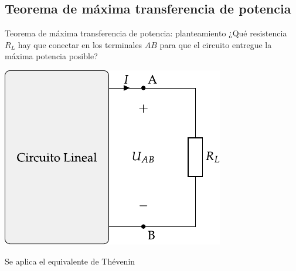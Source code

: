 \documentclass[aspectratio=169, xcolor={usenames,svgnames,dvipsnames}]{beamer}
\begin{document}

\subsection{Teorema de máxima transferencia de potencia}

\begin{frame}{Teorema de máxima transferencia de potencia: \hspace{4mm}planteamiento}
    ¿Qué resistencia \(R_L\) hay que conectar en los terminales $AB$ para que el circuito entregue la \alert{máxima potencia posible}?
    
    \begin{center}
        \includegraphics[height=0.55\textheight]{../figs/thevenin_continua_red.pdf}
    \end{center}
    
    Se aplica el \alert{equivalente de Thévenin}
\end{frame}

\end{document}
